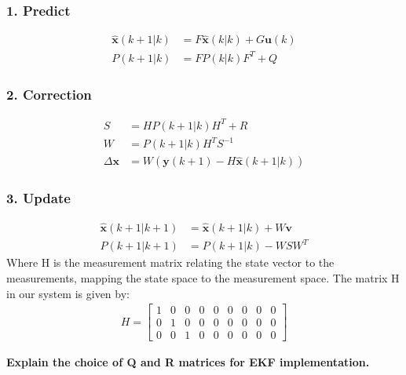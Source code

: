 \subsubsection*{1. Predict}

\begin{align}
    \hat{\mathbf{x}}(k+1 | k) &= F \hat{\mathbf{x}}(k | k) + G\mathbf{u}(k) \\
    P(k+1 | k) &= F P(k | k) F^T + Q
\end{align}

\subsubsection*{2. Correction}

\begin{align}
    S &= H P(k+1 | k) H^T + R \\
    W &= P(k+1 | k) H^T S^{-1} \\
    \Delta \mathbf{x} &= W \left( \mathbf{y}(k+1) - H \hat{\mathbf{x}}(k+1 | k) \right)
\end{align}

\subsubsection*{3. Update}

\begin{align}
    \hat{\mathbf{x}}(k+1 | k+1) &= \hat{\mathbf{x}}(k+1 | k) + W \mathbf{v} \\
    P(k+1 | k+1) &= P(k+1 | k) - W S W^T
\end{align}
Where H is the measurement matrix relating the state vector to the measurements, mapping the state space to the measurement space. The matrix H in our system is given by:
\begin{align*}
    H = \begin{bmatrix}
    1 & 0 & 0 & 0 & 0 & 0 & 0 & 0 & 0 \\
    0 & 1 & 0 & 0 & 0 & 0 & 0 & 0 & 0 \\
    0 & 0 & 1 & 0 & 0 & 0 & 0 & 0 & 0
    \end{bmatrix}
\end{align*}

\textbf{Explain the choice of Q and R matrices for EKF implementation.}\\

